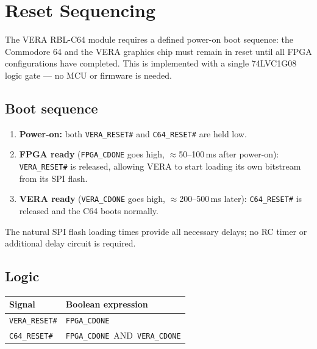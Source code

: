 \documentclass[11pt,a4paper]{article}
\newcommand{\sig}[1]{\texttt{#1}}
\begin{document}
\section{Reset Sequencing}
\label{sec:reset}

The VERA RBL-C64 module requires a defined power-on boot sequence: the
Commodore 64 and the VERA graphics chip must remain in reset until all
FPGA configurations have completed.  This is implemented with a single
74LVC1G08 logic gate --- no MCU or firmware is needed.

\subsection{Boot sequence}

\begin{enumerate}[noitemsep]
    \item \textbf{Power-on:} both \sig{VERA\_RESET\#} and
          \sig{C64\_RESET\#} are held low.
    \item \textbf{FPGA ready} (\sig{FPGA\_CDONE} goes high,
          $\approx$50--100\,ms after power-on): \sig{VERA\_RESET\#} is
          released, allowing VERA to start loading its own bitstream
          from its SPI flash.
    \item \textbf{VERA ready} (\sig{VERA\_CDONE} goes high,
          $\approx$200--500\,ms later): \sig{C64\_RESET\#} is released
          and the C64 boots normally.
\end{enumerate}

The natural SPI flash loading times provide all necessary delays; no RC
timer or additional delay circuit is required.

\subsection{Logic}

\begin{center}
\begin{tabular}{ll}
\toprule
\textbf{Signal} & \textbf{Boolean expression} \\
\midrule
\sig{VERA\_RESET\#} & \sig{FPGA\_CDONE} \\
\sig{C64\_RESET\#}  & \sig{FPGA\_CDONE}~AND~\sig{VERA\_CDONE} \\
\bottomrule
\end{tabular}
\end{center}
\end{document}
